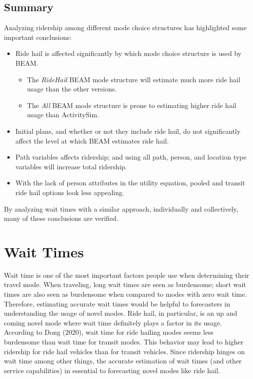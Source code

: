 \documentclass[12pt, oneside, openright]{byuthesis}
\begin{document}
\hypertarget{summary}{%
\subsection{Summary}\label{summary}}

Analyzing ridership among different mode choice structures has highlighted some important conclusions:

\begin{itemize}
\item
  Ride hail is affected significantly by which mode choice structure is used by BEAM.

  \begin{itemize}
  \item
    The \emph{RideHail} BEAM mode structure will estimate much more ride hail usage than the other versions.
  \item
    The \emph{All} BEAM mode structure is prone to estimating higher ride hail usage than ActivitySim.
  \end{itemize}
\item
  Initial plans, and whether or not they include ride hail, do not significantly affect the level at which BEAM estimates ride hail.
\item
  Path variables affects ridership; and using all path, person, and location type variables will increase total ridership.
\item
  With the lack of person attributes in the utility equation, pooled and transit ride hail options look less appealing.
\end{itemize}

By analyzing wait times with a similar approach, individually and collectively, many of these conclusions are verified.

\hypertarget{res-waits}{%
\section{Wait Times}\label{res-waits}}

Wait time is one of the most important factors people use when determining their travel mode. When traveling, long wait times are seen as burdensome; short wait times are also seen as burdensome when compared to modes with zero wait time. Therefore, estimating accurate wait times would be helpful to forecasters in understanding the usage of novel modes. Ride hail, in particular, is an up and coming novel mode where wait time definitely plays a factor in its usage. According to Dong (2020), wait time for ride hailing modes seems less burdensome than wait time for transit modes. This behavior may lead to higher ridership for ride hail vehicles than for transit vehicles. Since ridership hinges on wait time among other things, the accurate estimation of wait times (and other service capabilities) in essential to forecasting novel modes like ride hail.
\end{document}
